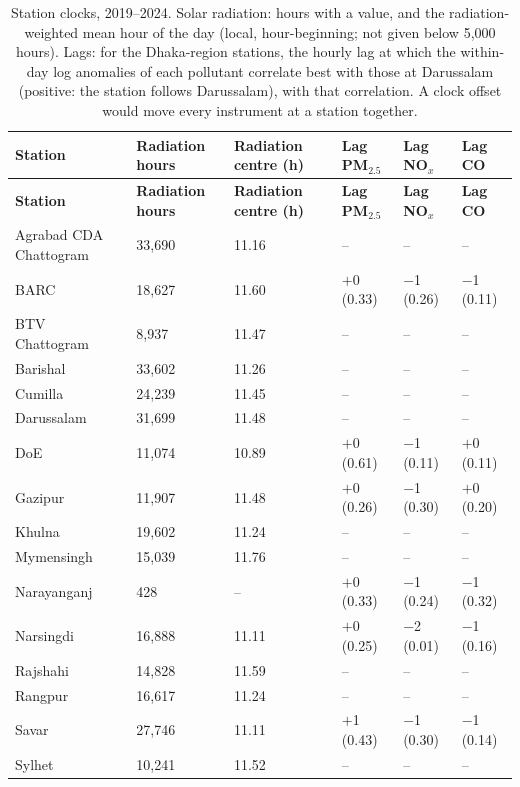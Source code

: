 \begingroup\footnotesize
\begin{longtable}{L{3.6cm} C{1.6cm} C{1.8cm} C{2.0cm} C{2.0cm} C{2.0cm}}
\caption{Station clocks, 2019--2024. Solar radiation: hours with a value, and the radiation-weighted mean hour of the day (local, hour-beginning; not given below 5,000 hours). Lags: for the Dhaka-region stations, the hourly lag at which the within-day log anomalies of each pollutant correlate best with those at Darussalam (positive: the station follows Darussalam), with that correlation. A clock offset would move every instrument at a station together.}\label{tab:s-clock}\\
\toprule
\textbf{Station} & \textbf{Radiation hours} & \textbf{Radiation centre (h)} & \textbf{Lag PM$_{2.5}$} & \textbf{Lag NO$_x$} & \textbf{Lag CO} \\
\midrule\endfirsthead
\toprule
\textbf{Station} & \textbf{Radiation hours} & \textbf{Radiation centre (h)} & \textbf{Lag PM$_{2.5}$} & \textbf{Lag NO$_x$} & \textbf{Lag CO} \\
\midrule\endhead
\bottomrule\endfoot
Agrabad CDA Chattogram & 33,690 & 11.16 & -- & -- & -- \\
BARC & 18,627 & 11.60 & $+$0 {\scriptsize(0.33)} & $-$1 {\scriptsize(0.26)} & $-$1 {\scriptsize(0.11)} \\
BTV Chattogram & 8,937 & 11.47 & -- & -- & -- \\
Barishal & 33,602 & 11.26 & -- & -- & -- \\
Cumilla & 24,239 & 11.45 & -- & -- & -- \\
Darussalam & 31,699 & 11.48 & -- & -- & -- \\
DoE & 11,074 & 10.89 & $+$0 {\scriptsize(0.61)} & $-$1 {\scriptsize(0.11)} & $+$0 {\scriptsize(0.11)} \\
Gazipur & 11,907 & 11.48 & $+$0 {\scriptsize(0.26)} & $-$1 {\scriptsize(0.30)} & $+$0 {\scriptsize(0.20)} \\
Khulna & 19,602 & 11.24 & -- & -- & -- \\
Mymensingh & 15,039 & 11.76 & -- & -- & -- \\
Narayanganj & 428 & -- & $+$0 {\scriptsize(0.33)} & $-$1 {\scriptsize(0.24)} & $-$1 {\scriptsize(0.32)} \\
Narsingdi & 16,888 & 11.11 & $+$0 {\scriptsize(0.25)} & $-$2 {\scriptsize(0.01)} & $-$1 {\scriptsize(0.16)} \\
Rajshahi & 14,828 & 11.59 & -- & -- & -- \\
Rangpur & 16,617 & 11.24 & -- & -- & -- \\
Savar & 27,746 & 11.11 & $+$1 {\scriptsize(0.43)} & $-$1 {\scriptsize(0.30)} & $-$1 {\scriptsize(0.14)} \\
Sylhet & 10,241 & 11.52 & -- & -- & -- \\
\end{longtable}
\endgroup
